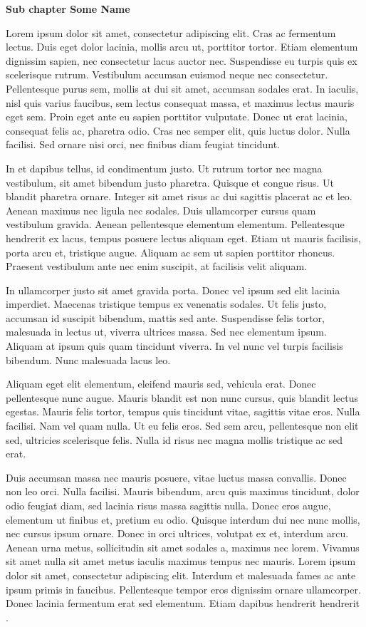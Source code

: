 \textbf{Sub chapter Some Name}

Lorem ipsum dolor sit amet, consectetur adipiscing elit. Cras ac fermentum lectus. Duis eget dolor lacinia, mollis arcu ut, porttitor tortor. Etiam elementum dignissim sapien, nec consectetur lacus auctor nec. Suspendisse eu turpis quis ex scelerisque rutrum. Vestibulum accumsan euismod neque nec consectetur. Pellentesque purus sem, mollis at dui sit amet, accumsan sodales erat. In iaculis, nisl quis varius faucibus, sem lectus consequat massa, et maximus lectus mauris eget sem. Proin eget ante eu sapien porttitor vulputate. Donec ut erat lacinia, consequat felis ac, pharetra odio. Cras nec semper elit, quis luctus dolor. Nulla facilisi. Sed ornare nisi orci, nec finibus diam feugiat tincidunt.

In et dapibus tellus, id condimentum justo. Ut rutrum tortor nec magna vestibulum, sit amet bibendum justo pharetra. Quisque et congue risus. Ut blandit pharetra ornare. Integer sit amet risus ac dui sagittis placerat ac et leo. Aenean maximus nec ligula nec sodales. Duis ullamcorper cursus quam vestibulum gravida. Aenean pellentesque elementum elementum. Pellentesque hendrerit ex lacus, tempus posuere lectus aliquam eget. Etiam ut mauris facilisis, porta arcu et, tristique augue. Aliquam ac sem ut sapien porttitor rhoncus. Praesent vestibulum ante nec enim suscipit, at facilisis velit aliquam.

In ullamcorper justo sit amet gravida porta. Donec vel ipsum sed elit lacinia imperdiet. Maecenas tristique tempus ex venenatis sodales. Ut felis justo, accumsan id suscipit bibendum, mattis sed ante. Suspendisse felis tortor, malesuada in lectus ut, viverra ultrices massa. Sed nec elementum ipsum. Aliquam at ipsum quis quam tincidunt viverra. In vel nunc vel turpis facilisis bibendum. Nunc malesuada lacus leo.

Aliquam eget elit elementum, eleifend mauris sed, vehicula erat. Donec pellentesque nunc augue. Mauris blandit est non nunc cursus, quis blandit lectus egestas. Mauris felis tortor, tempus quis tincidunt vitae, sagittis vitae eros. Nulla facilisi. Nam vel quam nulla. Ut eu felis eros. Sed sem arcu, pellentesque non elit sed, ultricies scelerisque felis. Nulla id risus nec magna mollis tristique ac sed erat.

Duis accumsan massa nec mauris posuere, vitae luctus massa convallis. Donec non leo orci. Nulla facilisi. Mauris bibendum, arcu quis maximus tincidunt, dolor odio feugiat diam, sed lacinia risus massa sagittis nulla. Donec eros augue, elementum ut finibus et, pretium eu odio. Quisque interdum dui nec nunc mollis, nec cursus ipsum ornare. Donec in orci ultrices, volutpat ex et, interdum arcu. Aenean urna metus, sollicitudin sit amet sodales a, maximus nec lorem. Vivamus sit amet nulla sit amet metus iaculis maximus tempus nec mauris. Lorem ipsum dolor sit amet, consectetur adipiscing elit. Interdum et malesuada fames ac ante ipsum primis in faucibus. Pellentesque tempor eros dignissim ornare ullamcorper. Donec lacinia fermentum erat sed elementum. Etiam dapibus hendrerit hendrerit \cite{LoremIpsum:2015:Online}.